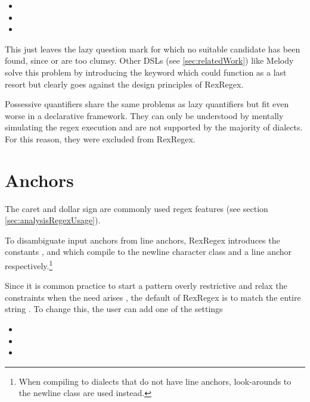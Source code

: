 \begin{itemize}
    \setlength\itemsep{0em}
    \vspace{-.7em}
    \item {}
    \item {} 
    \item {} 
    \vspace{-.7em}
\end{itemize}


This just leaves the lazy question mark  for which no suitable candidate has been found, since  or  are too clumsy. Other DSLs (see \ref{sec:relatedWork}) like Melody \cite{RegexDslMelody} solve this problem by introducing the  keyword which could function as a last resort but clearly goes against the design principles of RexRegex.

Possessive quantifiers share the same problems as lazy quantifiers but fit even worse in a declarative framework. They can only be understood by mentally simulating the regex execution and are not supported by the majority of dialects. For this reason, they were excluded from RexRegex.

\section{Anchors} \label{sec:dslAnchors}

The caret \pattern{\caret} and dollar sign \pattern{\$} are commonly used regex features (see section \ref{sec:analysisRegexUsage}). 

To disambiguate input anchors from line anchors, RexRegex introduces the constants ,  and  
which compile to the newline character class and a line anchor respectively.\footnote{When compiling to dialects that do not have line anchors, look-arounds to the newline class are used instead.} 

Since it is common practice to start a pattern overly restrictive and relax the constraints when the need arises \cite{RegexesAreHard}, the default of RexRegex is to match the entire string \pattern{\caret\placeholder\dollar}. To change this, the user can add one of the settings

\begin{itemize}
    \setlength\itemsep{0em}
    \vspace{-.7em}
    \item {}
    \item {}
    \item {}
    \vspace{-.7em}
\end{itemize}

